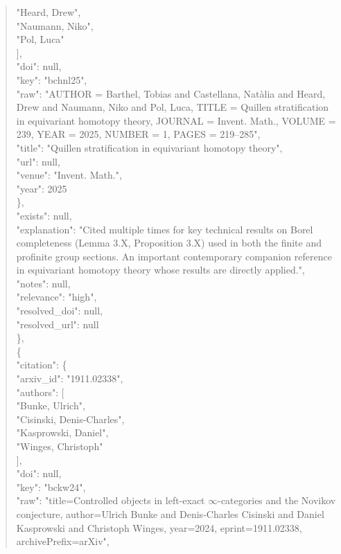 \documentclass[11pt]{article}
\begin{document}
\begin{quote}
          "Heard, Drew",\\
          "Naumann, Niko",\\
          "Pol, Luca"\\
        ],\\
        "doi": null,\\
        "key": "bchnl25",\\
        "raw": "AUTHOR = Barthel, Tobias and Castellana, Natàlia and Heard, Drew and Naumann, Niko and Pol, Luca, TITLE = Quillen stratification in equivariant homotopy theory, JOURNAL = Invent. Math., VOLUME = 239, YEAR = 2025, NUMBER = 1, PAGES = 219--285",\\
        "title": "Quillen stratification in equivariant homotopy theory",\\
        "url": null,\\
        "venue": "Invent. Math.",\\
        "year": 2025\\
      \},\\
      "exists": null,\\
      "explanation": "Cited multiple times for key technical results on Borel completeness (Lemma 3.X, Proposition 3.X) used in both the finite and profinite group sections. An important contemporary companion reference in equivariant homotopy theory whose results are directly applied.",\\
      "notes": null,\\
      "relevance": "high",\\
      "resolved\_doi": null,\\
      "resolved\_url": null\\
    \},\\
    \{\\
      "citation": \{\\
        "arxiv\_id": "1911.02338",\\
        "authors": [\\
          "Bunke, Ulrich",\\
          "Cisinski, Denis-Charles",\\
          "Kasprowski, Daniel",\\
          "Winges, Christoph"\\
        ],\\
        "doi": null,\\
        "key": "bckw24",\\
        "raw": "title=Controlled objects in left-exact \ensuremath{\infty}-categories and the Novikov conjecture, author=Ulrich Bunke and Denis-Charles Cisinski and Daniel Kasprowski and Christoph Winges, year=2024, eprint=1911.02338, archivePrefix=arXiv",\\

\end{quote}
\end{document}
